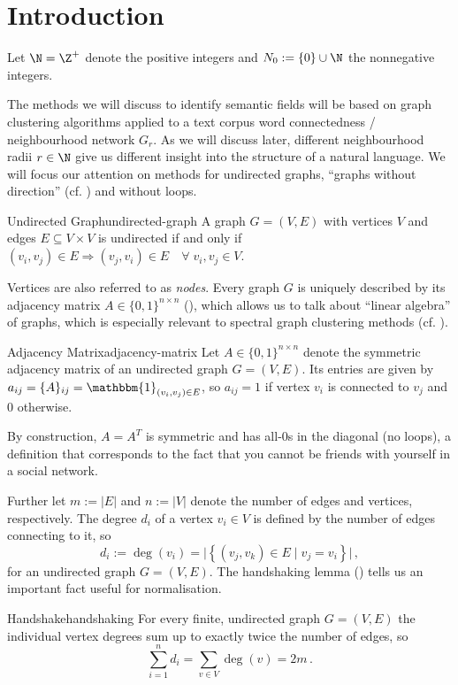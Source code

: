 \documentclass[12pt, a4paper]{article}
\newcommand{\identity}{\mathbbm{1}}
\begin{document}
  \pagebreak
  \pagestyle{normal}

  \tableofcontents
  \pagebreak

  \section{Introduction}
  Let $\N = \Z^+$ denote the positive integers and $N_0 := \{0\} \cup \N$ the nonnegative integers.

  The methods we will discuss to identify semantic fields will be based on graph clustering algorithms applied to a text corpus word connectedness / neighbourhood network $G_r$.
  As we will discuss later, different neighbourhood radii $r \in \N$ give us different insight into the structure of a natural language.
  We will focus our attention on methods for undirected graphs, ``graphs without direction'' (cf. ) and without loops.
  \begin{definition}{Undirected Graph}{undirected-graph}
    A graph $G = (V, E)$ with vertices $V$ and edges $E \subseteq V \times V$ is undirected if and only if $(v_i, v_j) \in E \Rightarrow (v_j, v_i) \in E \quad \forall\; v_i, v_j \in V$.
  \end{definition}

  Vertices are also referred to as \textit{nodes}.
  Every graph $G$ is uniquely described by its adjacency matrix $A \in \{0, 1\}^{n \times n}$ (), which allows us to talk about ``linear algebra'' of graphs, which is especially relevant to spectral graph clustering methods (cf. ).

  \begin{definition}{Adjacency Matrix}{adjacency-matrix}
    Let $A \in \{0, 1\}^{n \times n}$ denote the symmetric adjacency matrix of an undirected graph $G = (V, E)$. Its entries are given by $a_{ij} = \{A\}_{ij} = \identity_{(v_i, v_j) \in E}$, so $a_{ij} = 1$ if vertex $v_i$ is connected to $v_j$ and $0$ otherwise.
  \end{definition}

  By construction, $A = A^T$ is symmetric and has all-$0$s in the diagonal (no loops), a definition that corresponds to the fact that you cannot be friends with yourself in a social network.

  Further let $m := |E|$ and $n := |V|$ denote the number of edges and vertices, respectively.
  The degree $d_i$ of a vertex $v_i \in V$ is defined by the number of edges connecting to it, so $$d_i := \deg(v_i) = \big|\left\{(v_j, v_k) \in E \;|\; v_j = v_i\right\}\big|\,,$$ for an undirected graph $G = (V, E)$. The handshaking lemma () tells us an important fact useful for normalisation.
  \begin{lemma}{Handshake}{handshaking}
    For every finite, undirected graph $G = (V, E)$ the individual vertex degrees sum up to exactly twice the number of edges, so $$\sum_{i=1}^{n} d_i = \sum_{v \in V} \deg(v) = 2m\,.$$
  \end{lemma}
\end{document}
